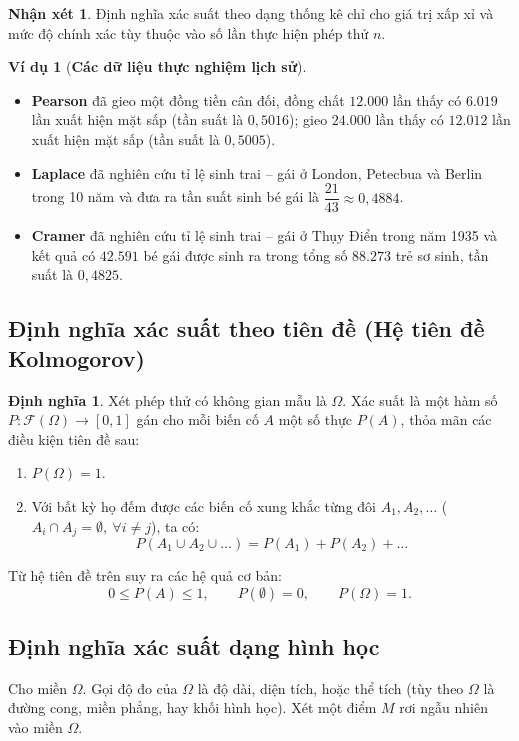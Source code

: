 \documentclass[12pt,a4paper]{article}
\theoremstyle{definition}
\newtheorem{dinhnghia}{Định nghĩa}[section]
\newtheorem{vidu}{Ví dụ}[section]
\newtheorem{nhanxet}{Nhận xét}[section]
\begin{document}
\begin{nhanxet}
Định nghĩa xác suất theo dạng thống kê chỉ cho giá trị xấp xỉ và mức độ chính xác tùy thuộc vào số lần thực hiện phép thử $n$.
\end{nhanxet}

\begin{vidu}[\textbf{Các dữ liệu thực nghiệm lịch sử}]
\begin{itemize}
    \item \textbf{Pearson} đã gieo một đồng tiền cân đối, đồng chất $12.000$ lần thấy có $6.019$ lần xuất hiện mặt sấp (tần suất là $0{,}5016$); gieo $24.000$ lần thấy có $12.012$ lần xuất hiện mặt sấp (tần suất là $0{,}5005$).
    \item \textbf{Laplace} đã nghiên cứu tỉ lệ sinh trai -- gái ở London, Petecbua và Berlin trong 10 năm và đưa ra tần suất sinh bé gái là $\dfrac{21}{43} \approx 0{,}4884$.
    \item \textbf{Cramer} đã nghiên cứu tỉ lệ sinh trai -- gái ở Thụy Điển trong năm 1935 và kết quả có $42.591$ bé gái được sinh ra trong tổng số $88.273$ trẻ sơ sinh, tần suất là $0{,}4825$.
\end{itemize}
\end{vidu}

\subsection{Định nghĩa xác suất theo tiên đề (Hệ tiên đề Kolmogorov)}
\begin{dinhnghia}
Xét phép thử có không gian mẫu là $\Omega$. Xác suất là một hàm số $P: \mathcal{F}(\Omega) \to [0, 1]$ gán cho mỗi biến cố $A$ một số thực $P(A)$, thỏa mãn các điều kiện tiên đề sau:
\begin{enumerate}[label=\arabic*)]
    \item $P(\Omega) = 1$.
    \item Với bất kỳ họ đếm được các biến cố xung khắc từng đôi $A_1, A_2, \dots$ ($A_i \cap A_j = \emptyset,\ \forall i \ne j$), ta có:
    \[
    P(A_1 \cup A_2 \cup \dots) = P(A_1) + P(A_2) + \dots
    \]
\end{enumerate}
Từ hệ tiên đề trên suy ra các hệ quả cơ bản:
\[
0 \le P(A) \le 1,\qquad P(\emptyset) = 0,\qquad P(\Omega) = 1.
\]
\end{dinhnghia}

\subsection{Định nghĩa xác suất dạng hình học}
Cho miền $\Omega$. Gọi độ đo của $\Omega$ là độ dài, diện tích, hoặc thể tích (tùy theo $\Omega$ là đường cong, miền phẳng, hay khối hình học). Xét một điểm $M$ rơi ngẫu nhiên vào miền $\Omega$.
\end{document}
